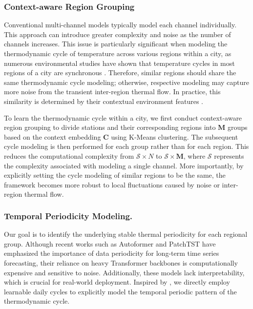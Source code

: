 \subsubsection{Context-aware Region Grouping}
Conventional multi-channel models typically model each channel individually. This approach can introduce greater complexity and noise as the number of channels increases. This issue is particularly significant when modeling the thermodynamic cycle of temperature across various regions within a city, as numerous environmental studies have shown that temperature cycles in most regions of a city are synchronous \cite{gomez2004experimental,yang2023urban,dimoudi2013investigation}. Therefore, similar regions should share the same thermodynamic cycle modeling; otherwise, respective modeling may capture more noise from the transient inter-region thermal flow. In practice, this similarity is determined by their contextual environment features \cite{gomez2004experimental,heisler2010urban}.

To learn the thermodynamic cycle within a city, we first conduct context-aware region grouping to divide stations and their corresponding regions into $\textbf{M}$ groups based on the context embedding $\mathbf{C}$ using K-Means clustering. The subsequent cycle modeling is then performed for each group rather than for each region. This reduces the computational complexity from $\mathcal{S} \times N$ to $\mathcal{S} \times \textbf{M}$, where $\mathcal{S}$ represents the complexity associated with modeling a single channel. More importantly, by explicitly setting the cycle modeling of similar regions to be the same, the framework becomes more robust to local fluctuations caused by noise or inter-region thermal flow.
\subsubsection{Temporal Periodicity Modeling.}\label{sec:temporal_cycle} Our goal is to identify the underlying stable thermal periodicity for each regional group. Although recent works such as Autoformer and PatchTST have emphasized the importance of data periodicity for long-term time series forecasting, their reliance on heavy Transformer backbones is computationally expensive and sensitive to noise. Additionally, these models lack interpretability, which is crucial for real-world deployment. Inspired by \cite{lincyclenet}, we directly employ learnable daily cycles to explicitly model the temporal periodic pattern of the thermodynamic cycle.

